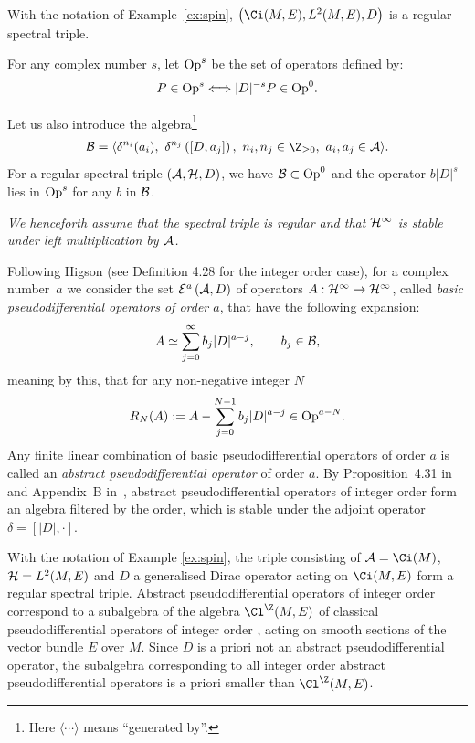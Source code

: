 \begin{example}  With the notation of Example~\ref{ex:spin}, $\left(\Ci(M, E),
L^2(M, E), D\right)$ is a regular spectral triple.
\end{example}

For any complex number $s$, let ${\rm Op}^s$ be the set
of operators def\/ined by:
\[
P\in {\rm Op}^s \Longleftrightarrow \vert D\vert^{-s} P\in {\rm Op}^0 .
\]

Let us also introduce the  algebra\footnote{Here $\langle\cdots \rangle$
means ``generated by''.}
 \begin{gather*}%
 {\cal B}=
 \langle \delta^{n_i}(a_i),\  \delta^{n_j}\left([D, a_j]\right), \  n_i, n_j\in \Z_{\geq 0}, \  a_i, a_j\in {\cal
  A}\rangle.
  \end{gather*}
 For a regular spectral triple $({\cal A}, {\cal H}, D)$, we have ${\cal B}\subset {\rm Op}^0$
and  the operator $b  \vert D\vert^s$ lies in ${\rm Op}^s$ for any $b$
in ${\cal B}$.


{\it We henceforth assume that  the spectral triple is regular and that ${\cal H}^\infty$ is stable under left
multiplication by ${\cal A}$.}

Following Higson \cite{Hig} (see Def\/inition 4.28 for the integer order case), for a complex number~$a$ we consider the set
${\cal E}^a\left({\cal A},D\right)$ of
operators $A:{\cal H}^\infty\to {\cal H}^\infty$, called  {\it  basic pseudodif\/ferential operators of order
 $a$}, that have the following expansion:
\[
A\simeq \sum_{j=0}^\infty b_j \vert D\vert^{a-j}, \qquad b_j\in {\cal
  B},
\]
   meaning by this, that for any non-negative integer $N$
\[
R_N(A):=A-\sum_{j=0}^{N-1}  b_{j} \vert D\vert^{a-j} \in {\rm  Op}^{a -N}.
\]
Any f\/inite linear combination of basic pseudodif\/ferential operators of order
$a$  is called
an {\it  abstract pseudodif\/ferential operator} of  order $a $.
By Proposition~4.31 in~\cite{Hig}
and Appendix~B in~\cite{CoMo}, abstract pseudodif\/ferential operators of integer order form an
algebra f\/iltered by the order, which is stable under the adjoint operator
$\delta=[\vert D\vert, \cdot]$.

\begin{example} With the notation  of Example \ref{ex:spin}, the triple consisting of  ${\cal A}=\Ci(M)$,
  ${\cal H}= L^2(M, E)$ and $D$ a generalised Dirac operator acting on $\Ci(M,
  E)$ form a regular spectral triple. Abstract pseudodif\/ferential operators
 of integer order correspond to a subalgebra of the algebra $\Cl^\Z(M, E)$ of classical pseudodif\/ferential operators of integer
  order \cite{Ho, Sh,Ta,Tr}, acting on smooth sections of the vector bundle $E$ over $M$. Since
   $D$ is a priori not an abstract pseudo\-dif\/ferential operator, the subalgebra
  corresponding to all integer order abstract pseudodif\/ferential operators is a
  priori smaller than  $\Cl^\Z(M, E)$.
\end{example}

